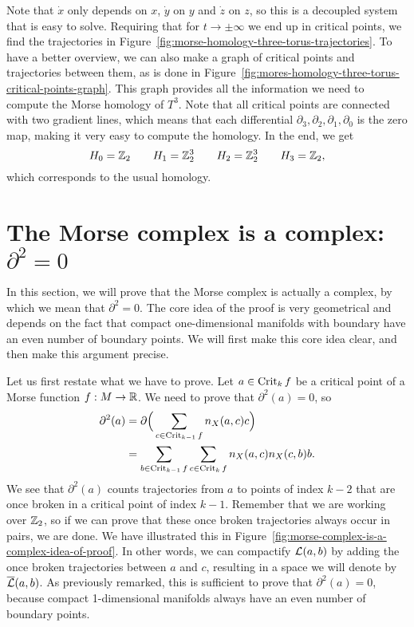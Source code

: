 \begin{eg}
    Note that $\dot x$ only depends on  $x$,  $\dot y$ on  $y$ and  $\dot z$ on $z$, so this is a decoupled system that is easy to solve.
    Requiring that for $t \to  \pm\infty$ we end up in critical points, we find the trajectories in Figure~\ref{fig:morse-homology-three-torus-trajectories}.
    To have a better overview, we can also make a graph of critical points and trajectories between them, as is done in Figure~\ref{fig:mores-homology-three-torus-critical-points-graph}.
    This graph provides all the information we need to compute the Morse homology of $T^{3}$.
    Note that all critical points are connected with two gradient lines, which means that each differential $\partial_3, \partial_{2}, \partial_1, \partial_0$ is the zero map, making it very easy to compute the homology. In the end, we get
    \[
    H_0 = \mathbb{Z}_2 \qquad 
    H_1 = \mathbb{Z}_2^3 \qquad 
    H_2 = \mathbb{Z}_2^3 \qquad 
    H_3 = \mathbb{Z}_2
    ,\] 
    which corresponds to the usual homology.
\end{eg}

\section{The Morse complex is a complex: $\partial^2 = 0$}
In this section, we will prove that the Morse complex is actually a complex, by which we mean that $\partial^2 = 0$.
The core idea of the proof is very geometrical and depends on the fact that compact one-dimensional manifolds with boundary have an even number of boundary points.
We will first make this core idea clear, and then make this argument precise.

Let us first restate what we have to prove. Let $a \in \operatorname{Crit}_k f$ be a critical point of a Morse function $f: M \to  \mathbb{R}$.
We need to prove that $\partial^2(a) = 0$, so
\begin{align*}
    \partial^2(a) &= \partial \Big(\sum_{c \in \operatorname{Crit}_{k-1} f} n_X(a, c) c\Big)\\
                  &= \sum_{b \in \operatorname{Crit}_{k-1} f} \sum_{c \in \operatorname{Crit}_k f} n_X(a, c) n_X(c, b) b
.\end{align*} 
We see that $\partial^2(a)$ counts trajectories from $a$ to points of index $k-2$ that are once broken in a critical point of index $k-1$.
Remember that we are working over $\mathbb{Z}_2$, so if we can prove that these once broken trajectories always occur in pairs, we are done.
    We have illustrated this in Figure~\ref{fig:morse-complex-is-a-complex-idea-of-proof}.
In other words, we can compactify $\mathcal L(a, b)$ by adding the once broken trajectories between $a$ and $c$, resulting in a space we will denote by $\overline{\mathcal L}(a, b)$.
As previously remarked, this is sufficient to prove that $\partial^2(a) = 0$, because compact 1-dimensional manifolds always have an even number of boundary points.

